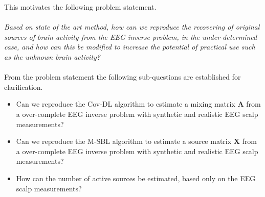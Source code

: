 \clearpage

This motivates the following problem statement.
\\ \\
\textit{Based on state of the art method, how can we reproduce the recovering of original sources of brain activity from the EEG inverse problem, in the under-determined case, and how can this be modified to increase the potential of practical use such as the unknown brain activity?}
\\ \\
From the problem statement the following sub-questions are established for clarification.
\begin{itemize}
\item Can we reproduce the Cov-DL algorithm to estimate a mixing matrix $\mathbf{A}$ from a over-complete EEG inverse problem with synthetic and realistic EEG scalp measurements?
\item Can we reproduce the M-SBL algorithm to estimate a source matrix $\mathbf{X}$ from a over-complete EEG inverse problem with synthetic and realistic EEG scalp measurements?
\item How can the number of active sources be estimated, based only on the EEG scalp measurements? 
\end{itemize}

 